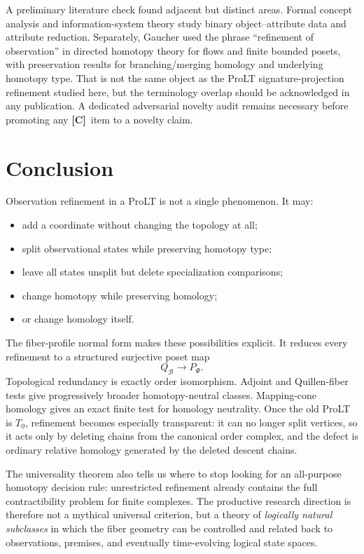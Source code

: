\documentclass[11pt]{article}
\theoremstyle{definition}
\newcommand{\statusC}{\textbf{[C]}}
\begin{document}
A preliminary literature check found adjacent but distinct areas. Formal concept analysis and information-system theory study binary object--attribute data and attribute reduction. Separately, Gaucher used the phrase ``refinement of observation'' in directed homotopy theory for flows and finite bounded posets, with preservation results for branching/merging homology and underlying homotopy type. That is not the same object as the ProLT signature-projection refinement studied here, but the terminology overlap should be acknowledged in any publication. A dedicated adversarial novelty audit remains necessary before promoting any \statusC\ item to a novelty claim.

\section{Conclusion}

Observation refinement in a ProLT is not a single phenomenon. It may:
\begin{itemize}
\item add a coordinate without changing the topology at all;
\item split observational states while preserving homotopy type;
\item leave all states unsplit but delete specialization comparisons;
\item change homotopy while preserving homology;
\item or change homology itself.
\end{itemize}

The fiber-profile normal form makes these possibilities explicit. It reduces every refinement to a structured surjective poset map
\[
Q_{\mathcal B}\longrightarrow P_\Phi.
\]
Topological redundancy is exactly order isomorphism. Adjoint and Quillen-fiber tests give progressively broader homotopy-neutral classes. Mapping-cone homology gives an exact finite test for homology neutrality. Once the old ProLT is \(T_0\), refinement becomes especially transparent: it can no longer split vertices, so it acts only by deleting chains from the canonical order complex, and the defect is ordinary relative homology generated by the deleted descent chains.

The universality theorem also tells us where to stop looking for an all-purpose homotopy decision rule: unrestricted refinement already contains the full contractibility problem for finite complexes. The productive research direction is therefore not a mythical universal criterion, but a theory of \emph{logically natural subclasses} in which the fiber geometry can be controlled and related back to observations, premises, and eventually time-evolving logical state spaces.
\end{document}
